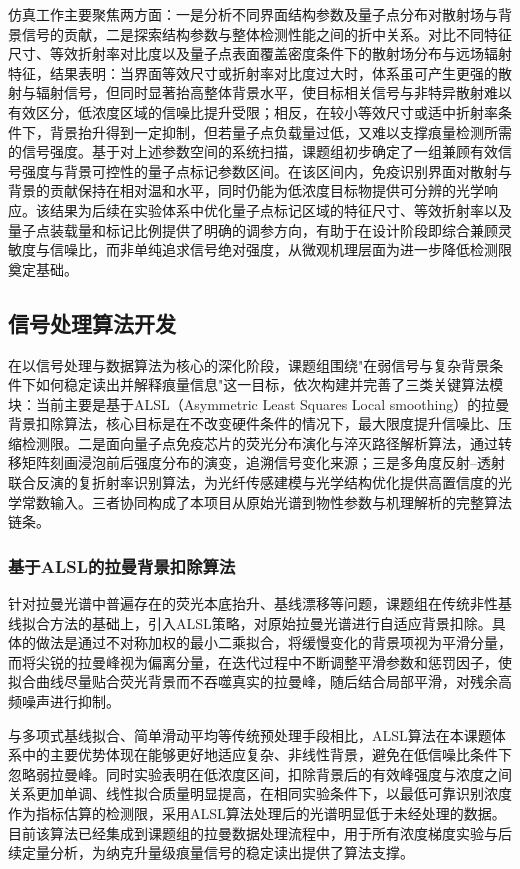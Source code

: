 \documentclass[12pt,a4paper]{article}
\begin{document}
仿真工作主要聚焦两方面：一是分析不同界面结构参数及量子点分布对散射场与背景信号的贡献，二是探索结构参数与整体检测性能之间的折中关系。对比不同特征尺寸、等效折射率对比度以及量子点表面覆盖密度条件下的散射场分布与远场辐射特征，结果表明：当界面等效尺寸或折射率对比度过大时，体系虽可产生更强的散射与辐射信号，但同时显著抬高整体背景水平，使目标相关信号与非特异散射难以有效区分，低浓度区域的信噪比提升受限；相反，在较小等效尺寸或适中折射率条件下，背景抬升得到一定抑制，但若量子点负载量过低，又难以支撑痕量检测所需的信号强度。基于对上述参数空间的系统扫描，课题组初步确定了一组兼顾有效信号强度与背景可控性的量子点标记参数区间。在该区间内，免疫识别界面对散射与背景的贡献保持在相对温和水平，同时仍能为低浓度目标物提供可分辨的光学响应。该结果为后续在实验体系中优化量子点标记区域的特征尺寸、等效折射率以及量子点装载量和标记比例提供了明确的调参方向，有助于在设计阶段即综合兼顾灵敏度与信噪比，而非单纯追求信号绝对强度，从微观机理层面为进一步降低检测限奠定基础。

\subsection{信号处理算法开发}

在以信号处理与数据算法为核心的深化阶段，课题组围绕"在弱信号与复杂背景条件下如何稳定读出并解释痕量信息"这一目标，依次构建并完善了三类关键算法模块：当前主要是基于ALSL（Asymmetric Least Squares Local smoothing）的拉曼背景扣除算法\cite{ref14}，核心目标是在不改变硬件条件的情况下，最大限度提升信噪比、压缩检测限。二是面向量子点免疫芯片的荧光分布演化与淬灭路径解析算法，通过转移矩阵刻画浸泡前后强度分布的演变，追溯信号变化来源；三是多角度反射--透射联合反演的复折射率识别算法，为光纤传感建模与光学结构优化提供高置信度的光学常数输入。三者协同构成了本项目从原始光谱到物性参数与机理解析的完整算法链条。

\subsubsection{基于ALSL的拉曼背景扣除算法}

针对拉曼光谱中普遍存在的荧光本底抬升、基线漂移等问题，课题组在传统非性基线拟合方法的基础上，引入ALSL策略，对原始拉曼光谱进行自适应背景扣除。具体的做法是通过不对称加权的最小二乘拟合，将缓慢变化的背景项视为平滑分量，而将尖锐的拉曼峰视为偏离分量，在迭代过程中不断调整平滑参数和惩罚因子，使拟合曲线尽量贴合荧光背景而不吞噬真实的拉曼峰，随后结合局部平滑，对残余高频噪声进行抑制。

与多项式基线拟合、简单滑动平均等传统预处理手段相比，ALSL算法在本课题体系中的主要优势体现在能够更好地适应复杂、非线性背景，避免在低信噪比条件下忽略弱拉曼峰。同时实验表明在低浓度区间，扣除背景后的有效峰强度与浓度之间关系更加单调、线性拟合质量明显提高，在相同实验条件下，以最低可靠识别浓度作为指标估算的检测限，采用ALSL算法处理后的光谱明显低于未经处理的数据。目前该算法已经集成到课题组的拉曼数据处理流程中，用于所有浓度梯度实验与后续定量分析，为纳克升量级痕量信号的稳定读出提供了算法支撑。
\end{document}
